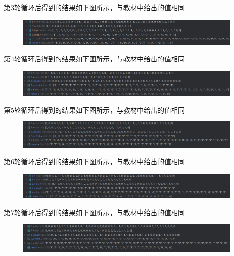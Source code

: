 \documentclass[a4paper,11pt,UTF8]{ctexart}
\newcommand{\bottomcaption}{%
\setlength{\abovecaptionskip}{6pt}%
\setlength{\belowcaptionskip}{6pt}%
\caption}
\newcommand{\xiaowuhao}{\fontsize{9pt}{\baselineskip}\selectfont}   %
\begin{document}
            第3轮循环后得到的结果如下图所示，与教材中给出的值相同
            \begin{figure}[H]
                \centering
                \includegraphics[width=15cm]{N3.png}
                \bottomcaption{\xiaowuhao{第3轮循环的结果}}
            \end{figure}
            第4轮循环后得到的结果如下图所示，与教材中给出的值相同
            \begin{figure}[H]
                \centering
                \includegraphics[width=15cm]{N4.png}
                \bottomcaption{\xiaowuhao{第4轮循环的结果}}
            \end{figure}
\newpage
            第5轮循环后得到的结果如下图所示，与教材中给出的值相同
            \begin{figure}[H]
                \centering
                \includegraphics[width=15cm]{N5.png}
                \bottomcaption{\xiaowuhao{第5轮循环的结果}}
            \end{figure}
            第6轮循环后得到的结果如下图所示，与教材中给出的值相同
            \begin{figure}[H]
                \centering
                \includegraphics[width=15cm]{N6.png}
                \bottomcaption{\xiaowuhao{第6轮循环的结果}}
            \end{figure}
            第7轮循环后得到的结果如下图所示，与教材中给出的值相同
            \begin{figure}[H]
                \centering
                \includegraphics[width=15cm]{N7.png}
                \bottomcaption{\xiaowuhao{第7轮循环的结果}}
            \end{figure}
\end{document}
